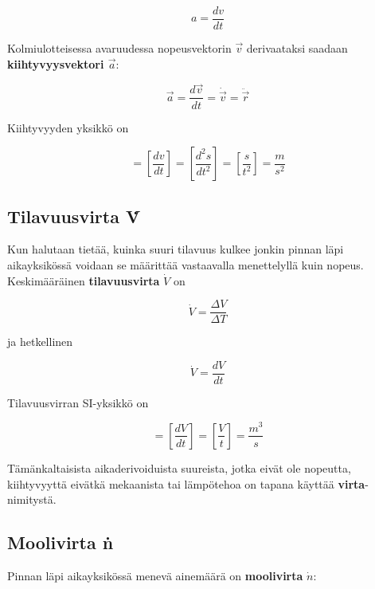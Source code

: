 \documentclass[12pt,a4paper,finnish]{book}
\begin{document}
\begin{equation}
 a = \frac{dv}{dt}
\end{equation}

Kolmiulotteisessa avaruudessa nopeusvektorin $\vec{v}$ derivaataksi saadaan \textbf{kiihtyvyysvektori $\vec{a}$}:

\begin{equation}
 \vec{a} = \frac{d\vec{v}}{dt} = \dot{\vec{v}} = \ddot{\vec{r}}
\end{equation}

Kiihtyvyyden yksikkö on

\begin{equation}
 [a] = \left[\frac{dv}{dt}\right] = \left[\frac{d^2s}{dt^2}\right] = \left[\frac{s}{t^2}\right] = \frac{m}{s^2}
\end{equation}

\subsection{Tilavuusvirta \.{V}}

Kun halutaan tietää, kuinka suuri tilavuus kulkee jonkin pinnan läpi aikayksikössä voidaan 
se määrittää vastaavalla menettelyllä kuin nopeus. Keskimääräinen \textbf{tilavuusvirta} $\dot{V}$ on

\begin{equation}
 \dot{V} = \frac{\Delta V}{\Delta T}
\end{equation}

ja hetkellinen

\begin{equation}
 \dot{V} = \frac{dV}{dt}
\end{equation}

Tilavuusvirran SI-yksikkö on

\begin{equation}
 [\dot{V}] = \left[\frac{dV}{dt}\right] = \left[\frac{V}{t}\right] = \frac{m^3}{s}
\end{equation}

Tämänkaltaisista aikaderivoiduista suureista, jotka eivät ole nopeutta, kiihtyvyyttä eivätkä mekaanista tai
lämpötehoa on tapana käyttää \textbf{virta}-nimitystä.

\subsection{Moolivirta \.{n}}

Pinnan läpi aikayksikössä menevä ainemäärä on \textbf{moolivirta} $\dot{n}$:
\end{document}
